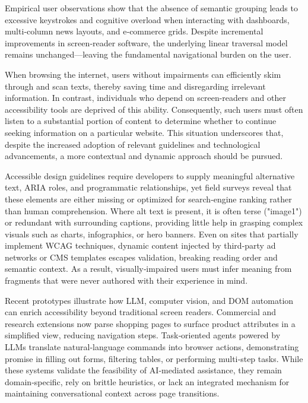 \documentclass[conference]{IEEEtran}
\begin{document}
Empirical user observations show that the absence of semantic grouping leads to excessive keystrokes and cognitive overload when interacting with dashboards, multi‑column news layouts, and e‑commerce grids. Despite incremental improvements in screen‑reader software, the underlying linear traversal model remains unchanged—leaving the fundamental navigational burden on the user. \cite{ferdous2021semantic}

When browsing the internet, users without impairments can efficiently skim through and scan texts, thereby saving time and disregarding irrelevant information. In contrast, individuals who depend on screen-readers and other accessibility tools are deprived of this ability. Consequently, such users must often listen to a substantial portion of content to determine whether to continue seeking information on a particular website. \cite{Ramakrishnan2017-rn} This situation underscores that, despite the increased adoption of relevant guidelines and technological advancements, a more contextual and dynamic approach should be pursued.

Accessible design guidelines require developers to supply meaningful alternative text, ARIA roles, and programmatic relationships, yet field surveys reveal that these elements are either missing or optimized for search‑engine ranking rather than human comprehension. \cite{wcag2023} Where alt text is present, it is often terse ("image1") or redundant with surrounding captions, providing little help in grasping complex visuals such as charts, infographics, or hero banners. Even on sites that partially implement WCAG techniques, dynamic content injected by third‑party ad networks or CMS templates escapes validation, breaking reading order and semantic context. \cite{wcagchallenges2025} As a result, visually‑impaired users must infer meaning from fragments that were never authored with their experience in mind.

Recent prototypes illustrate how LLM, computer vision, and DOM automation can enrich accessibility beyond traditional screen readers. Commercial and research extensions now parse shopping pages to surface product attributes in a simplified view, reducing navigation steps. \cite{prakash2024} Task‑oriented agents powered by LLMs translate natural‑language commands into browser actions, demonstrating promise in filling out forms, filtering tables, or performing multi‑step tasks. \cite{he2024webvoyager} While these systems validate the feasibility of AI‑mediated assistance, they remain domain‑specific, rely on brittle heuristics, or lack an integrated mechanism for maintaining conversational context across page transitions.\cite{kodandaram2024,mehendale2024}
\end{document}
